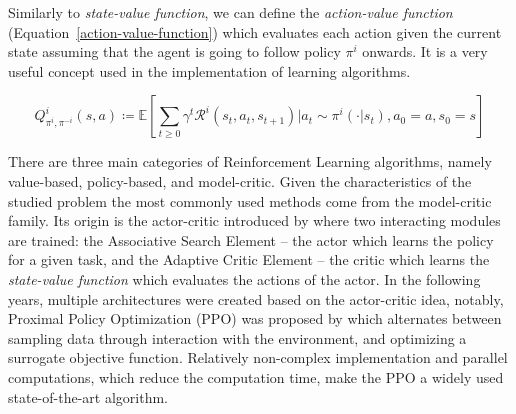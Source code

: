 \documentclass[preprint,12pt,authoryear]{elsarticle}
\begin{document}
Similarly to \textit{state-value function}, we can define the \textit{action-value function} (Equation~\ref{action-value-function}) which evaluates each action given the current state assuming that the agent is going to follow policy $\pi^i$ onwards. It is a very useful concept used in the implementation of learning algorithms.

\begin{equation}\label{action-value-function}
    Q^i_{\pi^i,\pi^{-i}}(s,a)\coloneqq\mathbb{E}\left[\sum\limits_{t\geq0}\gamma^t\mathcal{R}^i(s_t,a_t,s_{t+1})\bigg| a_t\sim \pi^i(\cdot|s_t),a_0=a,s_0=s\right]
\end{equation}

 There are three main categories of Reinforcement Learning algorithms, namely value-based, policy-based, and model-critic. Given the characteristics of the studied problem the most commonly used methods come from the model-critic family. Its origin is the actor-critic introduced by \cite{barto1983} where two interacting modules are trained: the Associative Search Element -- the actor which learns the policy for a given task, and the Adaptive Critic Element -- the critic which learns the \textit{state-value function} which evaluates the actions of the actor. In the following years, multiple architectures were created based on the actor-critic idea, notably, Proximal Policy Optimization (PPO) was proposed by \cite{Schulman2017} which alternates between sampling data through interaction with the environment, and optimizing a surrogate objective function. Relatively non-complex implementation and parallel computations, which reduce the computation time, make the PPO a widely used state-of-the-art algorithm.
\end{document}
